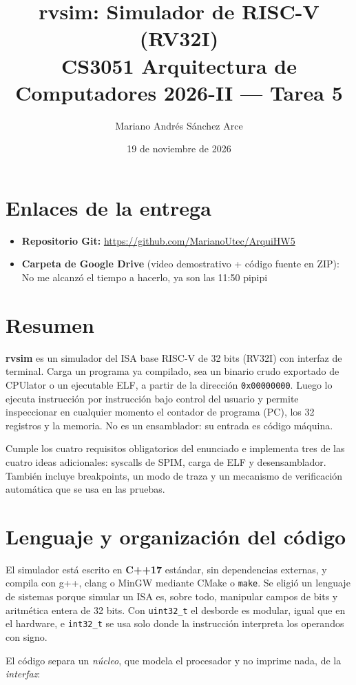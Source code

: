 \documentclass[11pt,a4paper]{article}
\title{\textbf{rvsim: Simulador de RISC-V (RV32I)}\\[2pt]
\large CS3051 Arquitectura de Computadores 2026-II --- Tarea 5}
\author{Mariano Andrés Sánchez Arce}
\date{19 de noviembre de 2026}
\newcommand{\cmd}[1]{\texttt{#1}}
\begin{document}
\maketitle

\section*{Enlaces de la entrega}
\begin{itemize}
  \item \textbf{Repositorio Git:} \url{https://github.com/MarianoUtec/ArquiHW5}
  \item \textbf{Carpeta de Google Drive} (video demostrativo + código fuente en ZIP):
        {No me alcanzó el tiempo a hacerlo, ya son las 11:50 pipipi}
\end{itemize}

\section{Resumen}
\textbf{rvsim} es un simulador del ISA base RISC-V de 32 bits (RV32I) con interfaz de terminal. Carga un programa
ya compilado, sea un binario crudo exportado de CPUlator o un ejecutable ELF, a partir de la dirección
\cmd{0x00000000}. Luego lo ejecuta instrucción por instrucción bajo control del usuario y permite inspeccionar en
cualquier momento el contador de programa (PC), los 32 registros y la memoria. No es un ensamblador: su entrada es
código máquina.

Cumple los cuatro requisitos obligatorios del enunciado e implementa tres de las cuatro ideas adicionales:
syscalls de SPIM, carga de ELF y desensamblador. También incluye breakpoints, un modo de traza y un mecanismo de
verificación automática que se usa en las pruebas.

\section{Lenguaje y organización del código}
El simulador está escrito en \textbf{C++17} estándar, sin dependencias externas, y compila con g++, clang o
MinGW mediante CMake o \cmd{make}. Se eligió un lenguaje de sistemas porque simular un ISA es, sobre todo,
manipular campos de bits y aritmética entera de 32 bits. Con \cmd{uint32\_t} el desborde es modular, igual que en
el hardware, e \cmd{int32\_t} se usa solo donde la instrucción interpreta los operandos con signo.

El código separa un \emph{núcleo}, que modela el procesador y no imprime nada, de la \emph{interfaz}:
\end{document}
